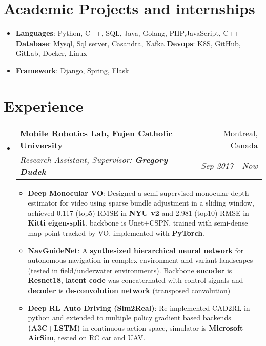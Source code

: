 \documentclass[letterpaper,10pt]{article}
\makeatletter
\newcommand{\resumeItem}[2]{
  \item\small{
    \textbf{#1}{: #2 \vspace{-2pt}}
  }
}
\newcommand{\resumeSubheading}[4]{
  \vspace{-1pt}\item[]
  \begin{tabular*}{0.98\textwidth}{l@{\extracolsep{\fill}}r}
      \hspace{-10pt}\textbf{#1} & #2 \\
      \hspace{-10pt}\textit{\small#3} & \textit{\small #4} \\
    \end{tabular*}\vspace{-5pt}
}
\newcommand{\resumeSubHeadingListStart}{\begin{itemize}[leftmargin=*]}
\newcommand{\resumeSubHeadingListEnd}{\end{itemize}}
\newcommand{\resumeItemListStart}{\begin{itemize}}
\newcommand{\resumeItemListEnd}{\end{itemize}\vspace{-5pt}}
\newcommand{\shorterSection}[1]{\vspace{-10pt}\section{#1}}
\makeatother
\begin{document}
\shorterSection{Academic Projects and internships}
  \resumeSubHeadingListStart
  \small
    \item{
     \textbf{Languages}{: Python, C++, SQL, Java, Golang, PHP,JavaScript, C++}
     \hfill
     \textbf{Database}{: Mysql, Sql server, Casandra, Kafka}
     \hfill
     \textbf{Devops}{: K8S, GitHub, GitLab, Docker, Linux}
    }
    \vspace{-5pt}
    \item{
     \textbf{Framework}{: Django, Spring, Flask}
    }
\resumeSubHeadingListEnd

\shorterSection{\textcolor{titleblue}{Experience}}
  \resumeSubHeadingListStart

    \resumeSubheading
      {Mobile Robotics Lab, Fujen Catholic University}{Montreal, Canada}
      {Research Assistant, Supervisor: \textbf{Gregory Dudek}}{Sep 2017 - Now}
      \resumeItemListStart
        \resumeItem{Deep Monocular VO}
          { Designed a semi-supervised monocular depth estimator for video using sparse bundle adjustment in a sliding window, achieved 0.117 (top5) RMSE in \textbf{NYU v2} and 2.981 (top10) RMSE in \textbf{Kitti eigen-split}. backbone is Unet+CSPN, trained with semi-dense map point tracked by VO, implemented with \textbf{PyTorch}. }
        \resumeItem{NavGuideNet}
          {A \textbf{synthesized hierarchical neural network} for autonomous navigation in complex environment and variant landscapes (tested in field/underwater environments). Backbone \textbf{encoder} is \textbf{Resnet18}, \textbf{latent code} was concaternated with control signals and \textbf{decoder} is \textbf{de-convolution network} (transposed convolution)}
        \resumeItem{Deep RL Auto Driving (Sim2Real)}
          {Re-implemented CAD2RL in python and extended to multiple policy gradient based backends \textbf{(A3C+LSTM)} in continuous action space, simulator is \textbf{Microsoft AirSim}, tested on RC car and UAV.
          }
      \resumeItemListEnd

  \resumeSubHeadingListEnd
\end{document}
